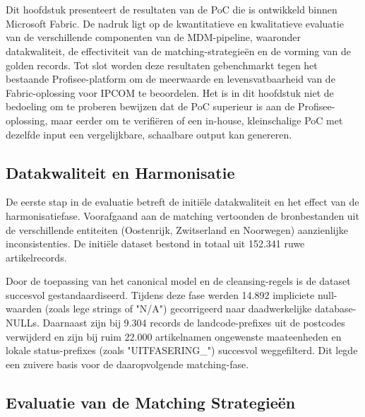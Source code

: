 
\chapter{}%
\label{ch:resultaten}

Dit hoofdstuk presenteert de resultaten van de PoC die is ontwikkeld binnen Microsoft Fabric. De nadruk ligt op de kwantitatieve en kwalitatieve evaluatie van de verschillende componenten van de MDM-pipeline, waaronder datakwaliteit, de effectiviteit van de matching-strategieën en de vorming van de golden records. Tot slot worden deze resultaten gebenchmarkt tegen het bestaande Profisee-platform om de meerwaarde en levensvatbaarheid van de Fabric-oplossing voor IPCOM te beoordelen. 
Het is in dit hoofdstuk niet de bedoeling om te proberen bewijzen dat de PoC superieur is aan de Profisee-oplossing, maar eerder om te verifiëren of een in-house, kleinschalige PoC met dezelfde input een vergelijkbare, schaalbare output kan genereren.

\section{Datakwaliteit en Harmonisatie}%
\label{sec:res-datakwaliteit}

De eerste stap in de evaluatie betreft de initiële datakwaliteit en het effect van de harmonisatiefase. Voorafgaand aan de matching vertoonden de bronbestanden uit de verschillende entiteiten (Oostenrijk, Zwitserland en Noorwegen) aanzienlijke inconsistenties. De initiële dataset bestond in totaal uit 152.341 ruwe artikelrecords.

Door de toepassing van het canonical model en de cleansing-regels is de dataset succesvol gestandaardiseerd. Tijdens deze fase werden 14.892 impliciete null-waarden (zoals lege strings of "N/A") gecorrigeerd naar daadwerkelijke database-NULLs. Daarnaast zijn bij 9.304 records de landcode-prefixes uit de postcodes verwijderd en zijn bij ruim 22.000 artikelnamen ongewenste maateenheden en lokale status-prefixes (zoals "UITFASERING\_") succesvol weggefilterd. Dit legde een zuivere basis voor de daaropvolgende matching-fase.

\section{Evaluatie van de Matching Strategieën}%
\label{sec:res-matching}

